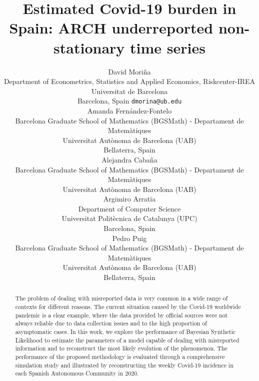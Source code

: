 \documentclass{article}
\title{Estimated Covid-19 burden in Spain: ARCH underreported non-stationary time series}
\author{
  David Mori\~na \\
  Department of Econometrics, Statistics and Applied Economics, Riskcenter-IREA\\ 
  Universitat de Barcelona\\ 
  Barcelona, Spain
  \texttt{dmorina@ub.edu} \\
   \And
   Amanda Fern\'andez-Fontelo \\
   Barcelona Graduate School of Mathematics (BGSMath) - Departament de Matem\`atiques\\ Universitat Aut\`onoma de Barcelona (UAB) \\
   Bellaterra, Spain \\
  \And
  Alejandra Caba\~na \\
  Barcelona Graduate School of Mathematics (BGSMath) - Departament de Matem\`atiques\\ Universitat Aut\`onoma de Barcelona (UAB) \\
  \And
  Argimiro Arratia \\
  Department of Computer Science\\
  Universitat Polit\`ecnica de Catalunya (UPC)\\
  Barcelona, Spain \\
  \And
  Pedro Puig \\
  Barcelona Graduate School of Mathematics (BGSMath) - Departament de Matem\`atiques\\ Universitat Aut\`onoma de Barcelona (UAB) \\
   Bellaterra, Spain \\
}
\begin{document}
\maketitle
\begin{abstract}
  The problem of dealing with misreported data is very common in a wide range of contexts for different reasons. The current situation caused by the Covid-19 worldwide pandemic is a clear example, where the data provided by official sources were not always reliable due to data collection issues and to the high proportion of asymptomatic cases. In this work, we explore the performance of Bayesian Synthetic Likelihood to estimate the parameters of a model capable of dealing with misreported information and to reconstruct the most likely evolution of the phenomenon. The performance of the proposed methodology is evaluated through a comprehensive simulation study and illustrated by reconstructing the weekly Covid-19 incidence in each Spanish Autonomous Community in 2020.
\end{abstract}


\end{document}

